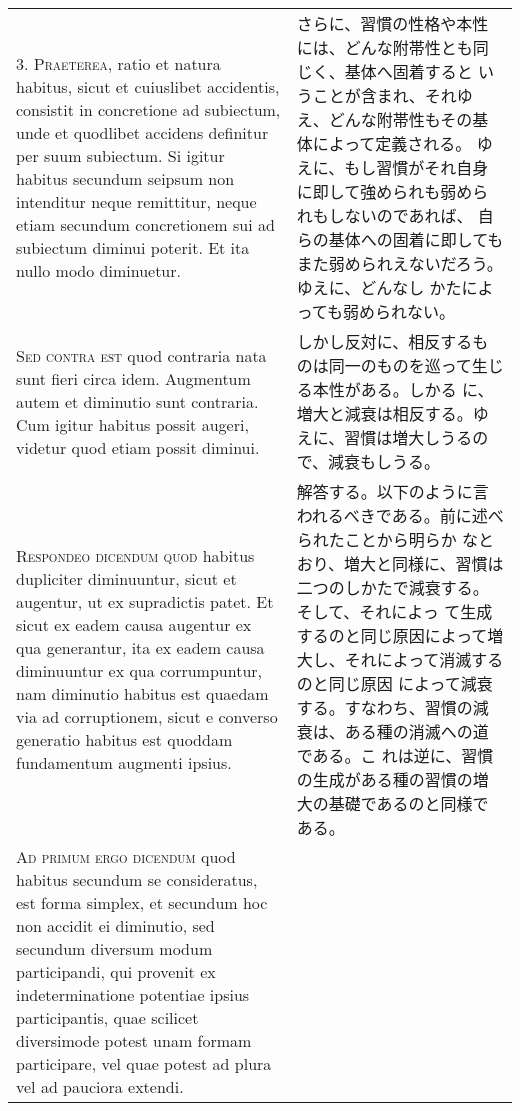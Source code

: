 \documentclass[10pt]{jsarticle} %
\begin{document}
\begin{longtable}{p{21em}p{21em}}
\\



3. {\scshape Praeterea}, ratio et natura habitus, sicut et cuiuslibet
accidentis, consistit in concretione ad subiectum, unde et quodlibet
accidens definitur per suum subiectum. Si igitur habitus secundum
seipsum non intenditur neque remittitur, neque etiam secundum
concretionem sui ad subiectum diminui poterit. Et ita nullo modo
diminuetur.

&

さらに、習慣の性格や本性には、どんな附帯性とも同じく、基体へ固着すると
いうことが含まれ、それゆえ、どんな附帯性もその基体によって定義される。
ゆえに、もし習慣がそれ自身に即して強められも弱められもしないのであれば、
自らの基体への固着に即してもまた弱められえないだろう。ゆえに、どんなし
かたによっても弱められない。

\\



{\scshape Sed contra est} quod contraria nata sunt fieri circa
idem. Augmentum autem et diminutio sunt contraria. Cum igitur habitus
possit augeri, videtur quod etiam possit diminui.

&

しかし反対に、相反するものは同一のものを巡って生じる本性がある。しかる
に、増大と減衰は相反する。ゆえに、習慣は増大しうるので、減衰もしうる。

\\



{\scshape Respondeo dicendum quod} habitus dupliciter diminuuntur,
sicut et augentur, ut ex supradictis patet. Et sicut ex eadem causa
augentur ex qua generantur, ita ex eadem causa diminuuntur ex qua
corrumpuntur, nam diminutio habitus est quaedam via ad corruptionem,
sicut e converso generatio habitus est quoddam fundamentum augmenti
ipsius.

&

解答する。以下のように言われるべきである。前に述べられたことから明らか
なとおり、増大と同様に、習慣は二つのしかたで減衰する。そして、それによっ
て生成するのと同じ原因によって増大し、それによって消滅するのと同じ原因
によって減衰する。すなわち、習慣の減衰は、ある種の消滅への道である。こ
れは逆に、習慣の生成がある種の習慣の増大の基礎であるのと同様である。

\\



{\scshape Ad primum ergo dicendum} quod habitus secundum se
consideratus, est forma simplex, et secundum hoc non accidit ei
diminutio, sed secundum diversum modum participandi, qui provenit ex
indeterminatione potentiae ipsius participantis, quae scilicet
diversimode potest unam formam participare, vel quae potest ad plura
vel ad pauciora extendi.


\end{longtable}
\end{document}
